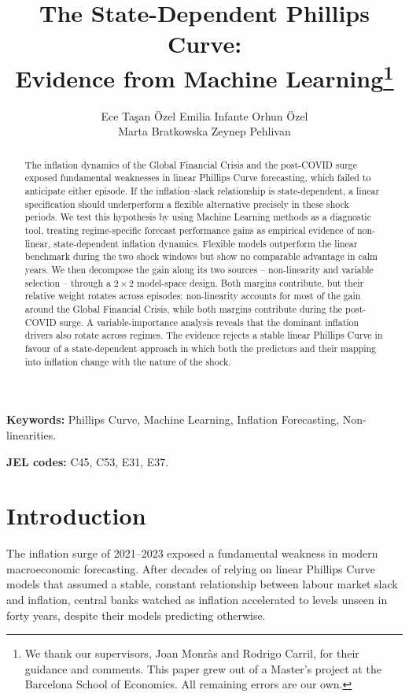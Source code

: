 \documentclass[12pt,a4paper]{article}
\title{The State-Dependent Phillips Curve:\\ Evidence from Machine Learning\thanks{We thank our supervisors, Joan Monr\`as and Rodrigo Carril, for their guidance and comments. This paper grew out of a Master's project at the Barcelona School of Economics. All remaining errors are our own.}}
\author{Ece Ta\c{s}an \"Ozel \quad Emilia Infante \quad Orhun \"Ozel\\
Marta Bratkowska \quad Zeynep Pehlivan\\[1ex]}
\begin{document}
\maketitle

\begin{abstract}
\noindent The inflation dynamics of the Global Financial Crisis and the post-COVID surge exposed fundamental weaknesses in linear Phillips Curve forecasting, which failed to anticipate either episode. If the inflation--slack relationship is state-dependent, a linear specification should underperform a flexible alternative precisely in these shock periods. We test this hypothesis by using Machine Learning methods as a diagnostic tool, treating regime-specific forecast performance gains as empirical evidence of non-linear, state-dependent inflation dynamics. Flexible models outperform the linear benchmark during the two shock windows but show no comparable advantage in calm years. We then decompose the gain along its two sources -- non-linearity and variable selection -- through a $2\times2$ model-space design. Both margins contribute, but their relative weight rotates across episodes: non-linearity accounts for most of the gain around the Global Financial Crisis, while both margins contribute during the post-COVID surge. A variable-importance analysis reveals that the dominant inflation drivers also rotate across regimes. The evidence rejects a stable linear Phillips Curve in favour of a state-dependent approach in which both the predictors and their mapping into inflation change with the nature of the shock.
\end{abstract}

\vspace{0.5em}
\noindent\textbf{Keywords:} Phillips Curve, Machine Learning, Inflation Forecasting, Non-linearities.

\noindent\textbf{JEL codes:} C45, C53, E31, E37.

\newpage
\section{Introduction}
\label{sec:introduction}

The inflation surge of 2021--2023 exposed a fundamental weakness in modern macroeconomic forecasting. After decades of relying on linear Phillips Curve models that assumed a stable, constant relationship between labour market slack and inflation, central banks watched as inflation accelerated to levels unseen in forty years, despite their models predicting otherwise.
\end{document}
